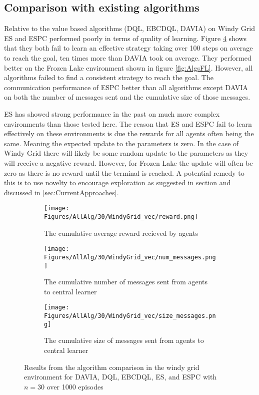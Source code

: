 \subsection{Comparison with existing algorithms}

Relative to the value based algorithms (DQL, EBCDQL, DAVIA) on Windy Grid ES and ESPC performed poorly in terms of quality of learning. Figure \ref{fig:AlgsWG} shows that they both fail to learn an effective strategy taking over 100 steps on average to reach the goal, ten times more than DAVIA took on average. They performed better on the Frozen Lake environment shown in figure \ref{fig:AlgsFL}. However, all algorithms failed to find a consistent strategy to reach the goal. The communication performance of ESPC better than all algorithms except DAVIA on both the number of messages sent and the cumulative size of those messages. 

ES has showed strong performance in the past on much more complex environments than those tested here. The reason that ES and ESPC fail to learn effectively on these environments is due the rewards for all agents often being the same. Meaning the expected update to the parameters is zero. In the case of Windy Grid there will likely be some random update to the parameters as they will receive a negative reward. However, for Frozen Lake the update will often be zero as there is no reward until the terminal is reached.
A potential remedy to this is to use novelty to encourage exploration as suggested in section \cite{NS-ES} and discussed in \ref{sec:CurrentApproaches}.


\begin{figure}
    \centering
    \begin{subfigure}{0.5\textwidth}
        \centering
        \texttt{[image: Figures/AllAlg/30/WindyGrid\_vec/reward.png]}
        \caption{The cumulative average reward recieved by agents}
        \label{fig:AlgsWGReward}
    \end{subfigure}
    \begin{subfigure}{0.5\textwidth}
        \centering
        \texttt{[image: Figures/AllAlg/30/WindyGrid\_vec/num\_messages.png]}
        \caption{The cumulative number of messages sent from agents to central learner}
        \label{fig:AlgsWGNumMessages}
    \end{subfigure}
    \begin{subfigure}{0.5\textwidth}
        \centering
        \texttt{[image: Figures/AllAlg/30/WindyGrid\_vec/size\_messages.png]}
        \caption{The cumulative size of messages sent from agents to central learner}
        \label{fig:AlgsWGSizeMessages}
    \end{subfigure}
    \caption{Results from the algorithm comparison in the windy grid environment for DAVIA, DQL, EBCDQL, ES, and ESPC with $n=30$ over 1000 episodes}
    \label{fig:AlgsWG}
\end{figure}

